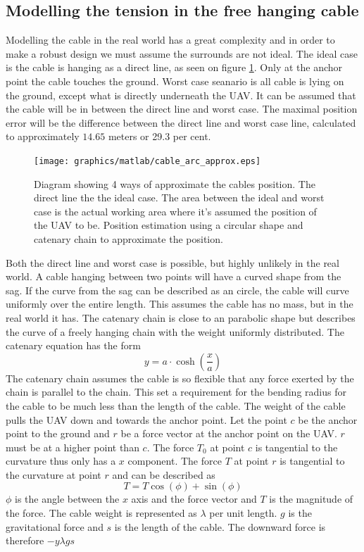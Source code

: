 \subsection{Modelling the tension in the free hanging cable}
Modelling the cable in the real world has a great complexity and in order to make a robust design we must assume the surrounds are not ideal. The ideal case is the cable is hanging as a direct line, as seen on figure \ref{fig:cable_model_cases}. Only at the anchor point the cable touches the ground. Worst case seanario is all cable is lying on the ground, except what is directly underneath the UAV. It can be assumed that the cable will be in between the direct line and worst case. The maximal position error will be the difference between the direct line and worst case line, calculated to approximately $14.65$ meters or 29.3 per cent. 

\begin{figure}[H]
\centering
\texttt{[image: graphics/matlab/cable\_arc\_approx.eps]}
\caption{Diagram showing 4 ways of approximate the cables position. The direct line the the ideal case. The area between the ideal and worst case is the actual working area where it's assumed the position of the UAV to be. Position estimation using a circular shape and catenary chain to approximate the position.}
\label{fig:cable_model_cases}
\end{figure}

\noindent
Both the direct line and worst case is possible, but highly unlikely in the real world. A cable hanging between two points will have a curved shape from the sag. If the curve from the sag can be described as an circle, the cable will curve uniformly over the entire length. This assumes the cable has no mass, but in the real world it has.
The catenary chain is close to an parabolic shape but describes the curve of a freely hanging chain with the weight uniformly distributed\cite{Whewelll1833}. The catenary equation has the form
\begin{equation}
y = a \cdot \cosh\left(\frac{x}{a}\right)
\end{equation}
The catenary chain assumes the cable is so flexible that any force exerted by the chain is parallel to the chain. This set a requirement for the bending radius for the cable to be much less than the length of the cable.
The weight of the cable pulls the UAV down and towards the anchor point. Let the point $c$ be the anchor point to the ground and $r$ be a force vector at the anchor point on the UAV. $r$ must be at a higher point than $c$. The force $T_0$ at point $c$ is tangential to the curvature thus only has a $x$ component. The force $T$ at point $r$ is tangential to the curvature at point $r$ and can be described as
\begin{equation}
T = T \cos(\phi) +  \sin(\phi)
\end{equation} 
$\phi$ is the angle between the $x$ axis and the force vector and $T$ is the magnitude of the force. The cable weight is represented as $\lambda$ per unit length. $g$ is the gravitational force and $s$ is the length of the cable. The downward force is therefore $-y \lambda g s$

